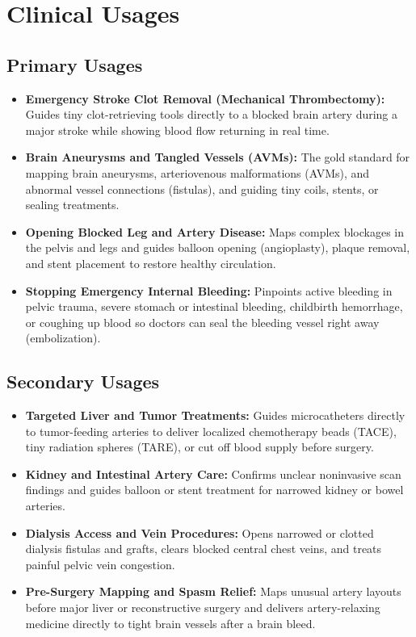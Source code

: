\section{Clinical Usages}

\subsection{Primary Usages}
\begin{itemize}
\item \textbf{Emergency Stroke Clot Removal (Mechanical Thrombectomy):} Guides tiny clot-retrieving tools directly to a blocked brain artery during a major stroke while showing blood flow returning in real time.
\item \textbf{Brain Aneurysms and Tangled Vessels (AVMs):} The gold standard for mapping brain aneurysms, arteriovenous malformations (AVMs), and abnormal vessel connections (fistulas), and guiding tiny coils, stents, or sealing treatments.
\item \textbf{Opening Blocked Leg and Artery Disease:} Maps complex blockages in the pelvis and legs and guides balloon opening (angioplasty), plaque removal, and stent placement to restore healthy circulation.
\item \textbf{Stopping Emergency Internal Bleeding:} Pinpoints active bleeding in pelvic trauma, severe stomach or intestinal bleeding, childbirth hemorrhage, or coughing up blood so doctors can seal the bleeding vessel right away (embolization).
\end{itemize}

\subsection{Secondary Usages}
\begin{itemize}
\item \textbf{Targeted Liver and Tumor Treatments:} Guides microcatheters directly to tumor-feeding arteries to deliver localized chemotherapy beads (TACE), tiny radiation spheres (TARE), or cut off blood supply before surgery.
\item \textbf{Kidney and Intestinal Artery Care:} Confirms unclear noninvasive scan findings and guides balloon or stent treatment for narrowed kidney or bowel arteries.
\item \textbf{Dialysis Access and Vein Procedures:} Opens narrowed or clotted dialysis fistulas and grafts, clears blocked central chest veins, and treats painful pelvic vein congestion.
\item \textbf{Pre-Surgery Mapping and Spasm Relief:} Maps unusual artery layouts before major liver or reconstructive surgery and delivers artery-relaxing medicine directly to tight brain vessels after a brain bleed.
\end{itemize}


